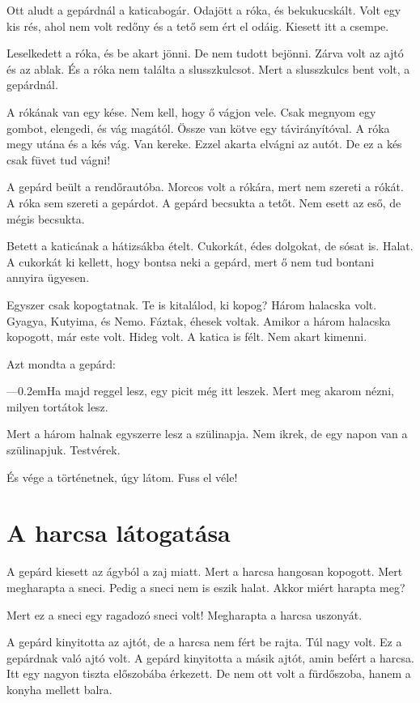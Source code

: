 \documentclass[12pt]{memoir}
\def\dash{---\kern 0.2em}
\begin{document}
Ott aludt a gepárdnál a katicabogár. Odajött a róka, és bekukucskált. Volt egy
kis rés, ahol nem volt redőny és a tető sem ért el odáig. Kiesett itt a csempe.

Leselkedett a róka, és be akart jönni. De nem tudott bejönni. Zárva volt az
ajtó és az ablak. És a róka nem találta a slusszkulcsot. Mert a slusszkulcs
bent volt, a gepárdnál.

A rókának van egy kése. Nem kell, hogy ő vágjon vele. Csak megnyom egy gombot,
elengedi, és vág magától. Össze van kötve egy távirányítóval. A róka megy utána
és a kés vág. Van kereke. Ezzel akarta elvágni az autót. De ez a kés csak füvet
tud vágni!

\bigskip

A gepárd beült a rendőrautóba. Morcos volt a rókára, mert nem szereti a rókát.
A róka sem szereti a gepárdot. A gepárd becsukta a tetőt. Nem esett az eső, de
mégis becsukta.

Betett a katicának a hátizsákba ételt. Cukorkát, édes dolgokat, de sósat is.
Halat. A cukorkát ki kellett, hogy bontsa neki a gepárd, mert ő nem tud bontani
annyira ügyesen.

Egyszer csak kopogtatnak. Te is kitalálod, ki kopog? Három halacska volt.
Gyagya, Kutyima, és Nemo. Fáztak, éhesek voltak. Amikor a három halacska
kopogott, már este volt. Hideg volt. A katica is félt. Nem akart kimenni.

Azt mondta a gepárd:

\dash Ha majd reggel lesz, egy picit még itt leszek. Mert meg akarom nézni,
milyen tortátok lesz.

Mert a három halnak egyszerre lesz a szülinapja. Nem ikrek, de egy napon van a
szülinapjuk.  Testvérek.

És vége a történetnek, úgy látom. Fuss el véle!
\cleartoverso


\section{A harcsa látogatása}
A gepárd kiesett az ágyból a zaj miatt. Mert a harcsa hangosan kopogott. Mert
megharapta a sneci. Pedig a sneci nem is eszik halat. Akkor miért harapta meg?

Mert ez a sneci egy ragadozó sneci volt! Megharapta a harcsa uszonyát.

A gepárd kinyitotta az ajtót, de a harcsa nem fért be rajta. Túl nagy volt. Ez
a gepárdnak való ajtó volt. A gepárd kinyitotta a másik ajtót, amin befért a
harcsa. Itt egy nagyon tiszta előszobába érkezett. De nem ott volt a
fürdőszoba, hanem a konyha mellett balra.
\end{document}
